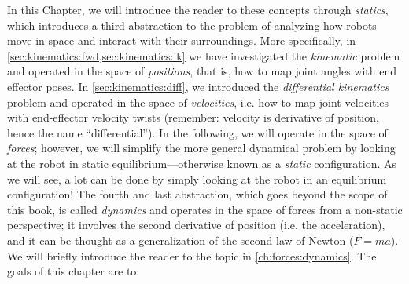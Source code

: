 In this Chapter, we will introduce the reader to these concepts through \emph{statics}, which introduces a third abstraction to the problem of analyzing how robots move in space and interact with their surroundings.
More specifically, in \cref{sec:kinematics:fwd,sec:kinematics:ik} we have investigated the \textsl{kinematic} problem and operated in the space of \textsl{positions}, that is, how to map joint angles with end effector poses.
In \cref{sec:kinematics:diff}, we introduced the \textsl{differential kinematics} problem and operated in the space of \textsl{velocities}, i.e. how to map joint velocities with end-effector velocity twists (remember: velocity is derivative of position, hence the name ``differential'').
In the following, we will operate in the space of \textsl{forces}; however, we will simplify the more general dynamical problem by looking at the robot in static equilibrium---otherwise known as a \textsl{static} configuration.
As we will see, a lot can be done by simply looking at the robot in an equilibrium configuration!
The fourth and last abstraction, which goes beyond the scope of this book, is called \textsl{dynamics} and operates in the space of forces from a non-static perspective; it involves the second derivative of position (i.e. the acceleration), and it can be thought as a generalization of the second law of Newton ($F=ma$).
We will briefly introduce the reader to the topic in \cref{ch:forces:dynamics}.
%
The goals of this chapter are to:

